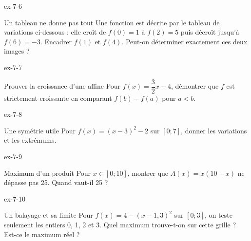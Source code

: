 \clearpage{}
\begin{blocLivre}{ex-7-6}
\begin{exercice}[2]{Un tableau ne donne pas tout}
Une fonction est décrite par le tableau de variations ci-dessous : elle croît de $f(0)=1$ à $f(2)=5$ puis décroît jusqu’à $f(6)=-3$. Encadrer $f(1)$ et $f(4)$. Peut-on déterminer exactement ces deux images ?
\label{fig-ex-7-6}
\end{exercice}
\end{blocLivre}
\begin{blocLivre}{ex-7-7}
\begin{exercice}[2]{Prouver la croissance d’une affine}
Pour $f(x)=\dfrac32x-4$, démontrer que $f$ est strictement croissante en comparant $f(b)-f(a)$ pour $a<b$.
\end{exercice}
\end{blocLivre}
\begin{blocLivre}{ex-7-8}
\begin{exercice}[2]{Une symétrie utile}
Pour $f(x)=(x-3)^2-2$ sur $[0;7]$, donner les variations et les extrémums.
\label{fig-ex-7-8}
\end{exercice}
\end{blocLivre}
\begin{blocLivre}{ex-7-9}
\begin{exercice}[2]{Maximum d’un produit}
Pour $x\in[0;10]$, montrer que $A(x)=x(10-x)$ ne dépasse pas 25. Quand vaut-il 25 ?
\label{fig-ex-7-9}
\end{exercice}
\end{blocLivre}
\begin{blocLivre}{ex-7-10}
\begin{exercice}[2]{Un balayage et sa limite}
Pour $f(x)=4-(x-1{,}3)^2$ sur $[0;3]$, on teste seulement les entiers 0, 1, 2 et 3. Quel maximum trouve-t-on sur cette grille ? Est-ce le maximum réel ?
\end{exercice}
\end{blocLivre}

